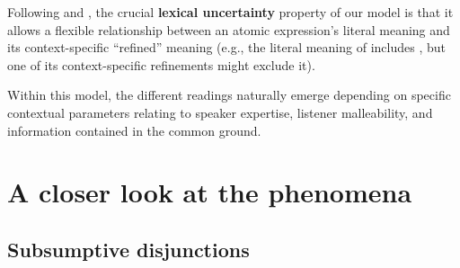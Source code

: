 \documentclass{article}
\begin{document}
\begin{examples}
\begin{examples}
  \item Following \citet{Bergen:Goodman:Levy:2012} and
    \citet{Smith:Goodman:Frank:2013}, the crucial \textbf{lexical
      uncertainty} property of our model is that it allows a flexible
    relationship between an atomic expression's literal meaning and
    its context-specific ``refined'' meaning (e.g., the literal
    meaning of  includes , but one of its
    context-specific refinements might exclude it).
  \end{examples}

\item Within this model, the different readings naturally emerge
  depending on specific contextual parameters relating to speaker
  expertise, listener malleability, and information contained in the
  common ground.

\end{examples}


\section{A closer look at the phenomena}\label{sec:data}


\subsection{Subsumptive disjunctions}\label{sec:data:subsumptive}
\end{document}
